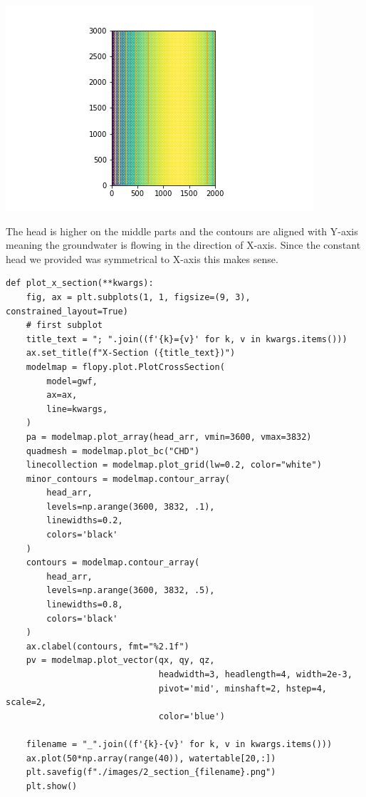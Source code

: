 \documentclass[titlepage,12pt]{unisubmission}
\begin{document}
\begin{center}
\includegraphics[width=.9\linewidth]{./images/2_plan.png}
\end{center}

The head is higher on the middle parts and the contours are aligned with Y-axis meaning the groundwater is flowing in the direction of X-axis. Since the constant head we provided was symmetrical to X-axis this makes sense.

\begin{verbatim}
def plot_x_section(**kwargs):
    fig, ax = plt.subplots(1, 1, figsize=(9, 3), constrained_layout=True)
    # first subplot
    title_text = "; ".join((f'{k}={v}' for k, v in kwargs.items()))
    ax.set_title(f"X-Section ({title_text})")
    modelmap = flopy.plot.PlotCrossSection(
        model=gwf,
        ax=ax,
        line=kwargs,
    )
    pa = modelmap.plot_array(head_arr, vmin=3600, vmax=3832)
    quadmesh = modelmap.plot_bc("CHD")
    linecollection = modelmap.plot_grid(lw=0.2, color="white")
    minor_contours = modelmap.contour_array(
        head_arr,
        levels=np.arange(3600, 3832, .1),
        linewidths=0.2,
        colors='black'
    )
    contours = modelmap.contour_array(
        head_arr,
        levels=np.arange(3600, 3832, .5),
        linewidths=0.8,
        colors='black'
    )
    ax.clabel(contours, fmt="%2.1f")
    pv = modelmap.plot_vector(qx, qy, qz,
                              headwidth=3, headlength=4, width=2e-3,
                              pivot='mid', minshaft=2, hstep=4, scale=2,
                              color='blue')

    filename = "_".join((f'{k}-{v}' for k, v in kwargs.items()))
    ax.plot(50*np.array(range(40)), watertable[20,:])
    plt.savefig(f"./images/2_section_{filename}.png")
    plt.show()
\end{verbatim}
\end{document}
